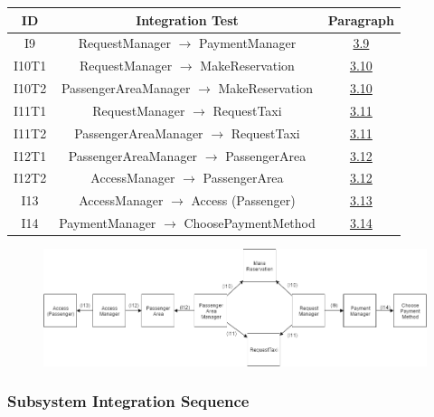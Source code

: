 \documentclass[18pt,oneside,a4paper, titlepage]{article}
\begin{document}
\begin{itemize}
					\vspace{0.5cm}
					\begin{center}
						\centering
						\begin{tabular}{c c c}
							\hline \textbf{ID} & \textbf{Integration Test} & \textbf{Paragraph} \\
							\hline		I9 & RequestManager $\rightarrow$ PaymentManager & \hyperlink{chapter 3.9}{3.9}\\
							\hline		I10T1 & RequestManager $\rightarrow$ MakeReservation & \hyperlink{chapter 3.10}{3.10} \\
							\hline		I10T2 & PassengerAreaManager $\rightarrow$ MakeReservation & \hyperlink{chapter 3.10}{3.10}\\
							\hline		I11T1 & RequestManager $\rightarrow$ RequestTaxi & \hyperlink{chapter 3.11}{3.11}\\
							\hline		I11T2 & PassengerAreaManager $\rightarrow$ RequestTaxi & \hyperlink{chapter 3.11}{3.11} \\
							\hline		I12T1 & PassengerAreaManager $\rightarrow$ PassengerArea & \hyperlink{chapter 3.12}{3.12} \\
							\hline		I12T2 & AccessManager $\rightarrow$ PassengerArea & \hyperlink{chapter 3.12}{3.12}\\
							\hline		I13 & AccessManager $\rightarrow$ Access (Passenger) & \hyperlink{chapter 3.13}{3.13} \\
							\hline		I14 & PaymentManager $\rightarrow$ ChoosePaymentMethod & \hyperlink{chapter 3.14}{3.14} \\
							\hline
						\end{tabular}
					\end{center}
					
					
					\begin{figure}[h]
						\centering
						\includegraphics[scale=0.4]{PassengerSubsystem.png}
					\end{figure}
			\end{itemize}
			\vspace{1cm}
			
		\subsubsection{Subsystem Integration Sequence}
			
\end{document}
